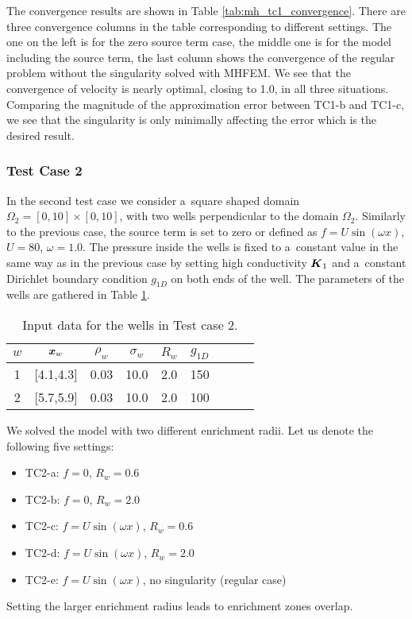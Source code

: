 The convergence results are shown in Table \ref{tab:mh_tc1_convergence}.
There are three convergence columns in the table corresponding to different settings.
The one on the left is for the zero source term case,
the middle one is for the model including the source term,
the last column shows the convergence of the regular problem without the singularity solved with MHFEM.
We see that the convergence of velocity is nearly optimal, closing to 1.0, in all three situations.
Comparing the magnitude of the approximation error between TC1-b and TC1-c,
we see that the singularity is only minimally affecting the error which is the desired result.


\subsubsection{Test Case 2}
In the second test case we consider a~square shaped domain $\Omega_2=[0,10]\times[0,10]$,
with two wells perpendicular to the domain $\Omega_2$.
Similarly to the previous case, the source term is set to zero or defined as $f=U\sin(\omega x)$, $U=80$, $\omega=1.0$.
The pressure inside the wells is fixed to a~constant value in the same way as in the previous case 
by setting high conductivity $\mathbf{\boldsymbol{K}}_1$ and a~constant Dirichlet boundary condition $g_{1D}$ on both ends of the well.
The parameters of the wells are gathered in Table \ref{tab:tc2_data}.
%
\begin{table}[!hb]
\begin{center}
\begin{tabular}{ccccccccc}
\toprule
$w$ & $\mathbf{\boldsymbol{x}}_w$  & $\rho_w$ & $\sigma_w$ & $R_w$ & $g_{1D}$\\
\midrule
1& [4.1,4.3] & 0.03 & 10.0 & 2.0 & 150 \\
2& [5.7,5.9] & 0.03 & 10.0 & 2.0 & 100 \\
\bottomrule
\end{tabular}
\caption{Input data for the wells in Test case 2.}
\label{tab:tc2_data}
\end{center}
\end{table}

We solved the model with two different enrichment radii. Let us denote the following five settings:
\begin{itemize}
    \item TC2-a: $f=0$, $R_w=0.6$
    \item TC2-b: $f=0$, $R_w=2.0$
    \item TC2-c: $f=U\sin(\omega x)$, $R_w=0.6$
    \item TC2-d: $f=U\sin(\omega x)$, $R_w=2.0$
    \item TC2-e: $f=U\sin(\omega x)$, no singularity (regular case)
\end{itemize}
Setting the larger enrichment radius leads to enrichment zones overlap.

